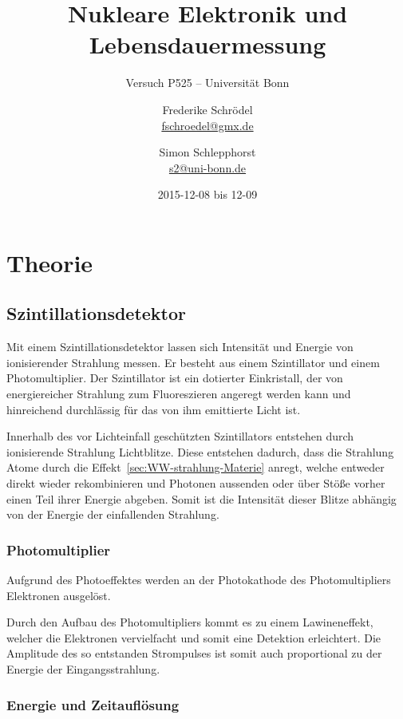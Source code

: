 \documentclass[11pt, ngerman, fleqn, DIV=15, headinclude, BCOR=2cm]{scrreprt}
\title{Nukleare Elektronik und Lebensdauermessung}
\subtitle{Versuch P525 -- Universität Bonn}
\author{
	Frederike Schrödel \\
	\small{\href{mailto:fschroedel@gmx.de}{fschroedel@gmx.de}}
	\and
	Simon Schlepphorst \\
	\small{\href{mailto:s2@uni-bonn.de}{s2@uni-bonn.de}}
}
\date{2015-12-08 bis 12-09}
\begin{document}
\maketitle

\begin{abstract}
\end{abstract}


\tableofcontents

\chapter{Theorie}


\section{Szintillationsdetektor}

Mit einem Szintillationsdetektor lassen sich Intensität und Energie von
ionisierender Strahlung messen.
Er besteht aus einem Szintillator und einem Photomultiplier.
Der Szintillator ist ein dotierter Einkristall, der von energiereicher
Strahlung zum Fluoreszieren angeregt werden kann und hinreichend
durchlässig für das von ihm emittierte Licht ist.

Innerhalb des vor Lichteinfall geschützten Szintillators entstehen durch
ionisierende Strahlung Lichtblitze. 
Diese entstehen dadurch, dass die Strahlung Atome durch die
Effekt~\ref{sec:WW-strahlung-Materie} anregt, welche entweder direkt
wieder rekombinieren und Photonen aussenden oder über Stöße vorher einen Teil
ihrer Energie abgeben.
Somit ist die Intensität dieser Blitze abhängig von der Energie der einfallenden Strahlung.

\subsection{Photomultiplier}

Aufgrund des Photoeffektes werden an der Photokathode des Photomultipliers
Elektronen ausgelöst.

Durch den Aufbau des Photomultipliers kommt es zu einem Lawineneffekt,
welcher die Elektronen vervielfacht und somit eine Detektion erleichtert.
Die Amplitude des so entstanden Strompulses ist somit auch proportional zu der
Energie der Eingangsstrahlung.

\subsection{Energie und Zeitauflösung}
\end{document}

